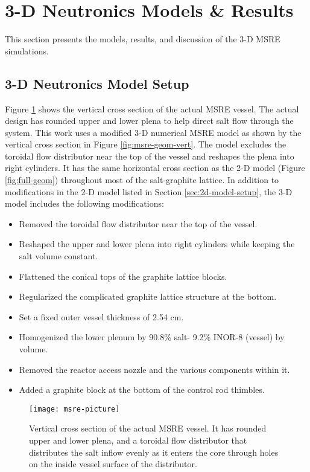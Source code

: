 \section{3-D Neutronics Models \& Results} \label{sec:3d-results}

This section presents the models, results, and discussion of the 3-D \gls{MSRE} simulations.

\subsection{3-D Neutronics Model Setup} \label{sec:3d-model-setup}

Figure \ref{fig:msre-picture} shows the vertical cross section of the actual \gls{MSRE} vessel.
The actual design has rounded upper and lower plena to help direct salt flow through the system.
This work uses a modified 3-D numerical \gls{MSRE} model as shown by the vertical cross section
in Figure \ref{fig:msre-geom-vert}. The model excludes the toroidal flow distributor near the top
of the vessel and reshapes the plena into right cylinders. It has the same horizontal cross section
as the 2-D model (Figure \ref{fig:full-geom}) throughout most of the salt-graphite lattice. In
addition to modifications in the 2-D model listed in Section \ref{sec:2d-model-setup}, the
3-D model includes the following modifications:

\begin{itemize}
  \item Removed the toroidal flow distributor near the top of the vessel.
  \item Reshaped the upper and lower plena into right cylinders while keeping the salt volume
    constant.
  \item Flattened the conical tops of the graphite lattice blocks.
  \item Regularized the complicated graphite lattice structure at the bottom.
  \item Set a fixed outer vessel thickness of 2.54 cm.
  \item Homogenized the lower plenum by 90.8\% salt- 9.2\% INOR-8 (vessel) by volume.
  \item Removed the reactor access nozzle and the various components within it.
  \item Added a graphite block at the bottom of the control rod thimbles.
\end{itemize}

\begin{figure}[p]
  \centering
  \texttt{[image: msre-picture]}
  \caption{Vertical cross section of the actual \gls{MSRE} vessel. It has rounded upper and lower
  plena, and a toroidal flow distributor that distributes the salt inflow evenly as it enters the
  core through holes on the inside vessel surface of the distributor.}
  \label{fig:msre-picture}
\end{figure}


